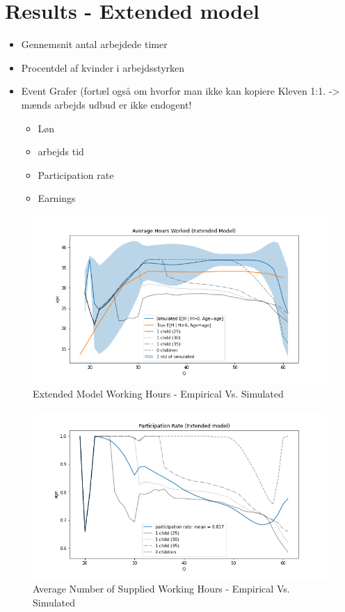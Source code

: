 \section{Results - Extended model}


\begin{itemize}
    \item Gennemsnit antal arbejdede timer
    \item Procentdel af kvinder i arbejdsstyrken
    \item Event Grafer (fortæl også om hvorfor man ikke kan kopiere Kleven 1:1. -> mænds arbejds udbud er ikke endogent!
    \begin{itemize}
        \item Løn
        \item arbejds tid
        \item Participation rate
        \item Earnings
    \end{itemize}
\end{itemize}


\begin{figure}
    \centering
    \includegraphics[scale=0.4]{figures/extended_model_average_hours.png}
    \caption{Extended Model Working Hours - Empirical Vs. Simulated}
    \label{fig:ext_model_working_hours}
\end{figure}


\begin{figure}
    \centering
    \includegraphics[scale=0.4]{figures/extended_model_participation_rates.png}
    \caption{Average Number of Supplied Working Hours - Empirical Vs. Simulated}
    \label{fig:ext_model_particpation_rates}
\end{figure}


